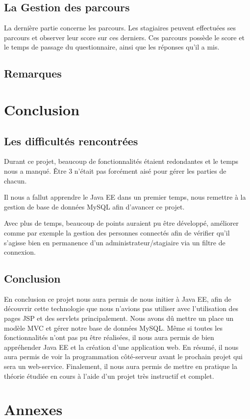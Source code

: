 \documentclass[a4paper]{article}
\begin{document}

\subsection{La Gestion des parcours}

La dernière partie concerne les parcours. Les stagiaires peuvent effectuées ses parcours et observer leur score sur ces derniers. Ces parcours possède le score et le temps de passage du questionnaire, ainsi que les réponses qu'il a mis.


\subsection{Remarques}


\section{Conclusion}

\subsection{Les difficultés rencontrées}

Durant ce projet, beaucoup de fonctionnalités étaient redondantes et le temps nous a manqué.
Être $3$ n'était pas forcément aisé pour gérer les parties de chacun.

Il nous a fallut apprendre le Java EE dans un premier temps, nous remettre à la gestion de base de données MySQL afin d'avancer ce projet.

Avec plus de temps, beaucoup de points auraient pu être développé, améliorer comme par exemple la gestion des personnes connectés afin de vérifier qu'il s'agisse bien en permanence d'un administrateur/stagiaire via un filtre de connexion.

\subsection{Conclusion}

En conclusion ce projet nous aura permis de nous initier à Java EE, afin de découvrir cette technologie que nous n'avions pas utiliser avec l'utilisation des pages JSP et des servlets principalement. Nous avons dû mettre un place un modèle MVC et gérer notre base de données MySQL.
Même si toutes les fonctionnalités n'ont pas pu être réalisées, il nous aura permis de bien appréhender Java EE et la création d'une application web.
En résumé, il nous aura permis de voir la programmation côté-serveur avant le prochain projet qui sera un web-service. Finalement, il nous aura permis de mettre en pratique la théorie étudiée en cours à l'aide d'un projet très instructif et complet.

\newpage
\section{Annexes}

\end{document}
